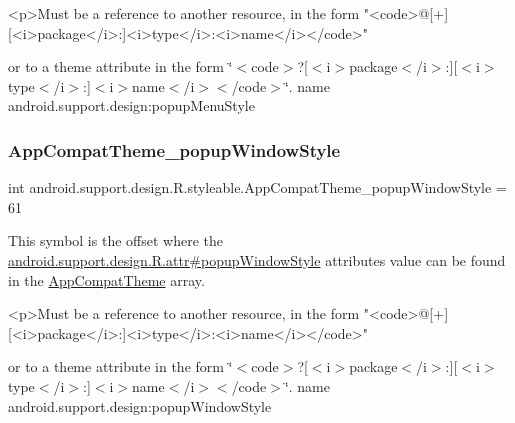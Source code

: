 \begin{DoxyVerb}      <p>Must be a reference to another resource, in the form "<code>@[+][<i>package</i>:]<i>type</i>:<i>name</i></code>"
\end{DoxyVerb}
 or to a theme attribute in the form \char`\"{}$<$code$>$?\mbox{[}$<$i$>$package$<$/i$>$\+:\mbox{]}\mbox{[}$<$i$>$type$<$/i$>$\+:\mbox{]}$<$i$>$name$<$/i$>$$<$/code$>$\char`\"{}.  name android.\+support.\+design\+:popup\+Menu\+Style \mbox{\label{classandroid_1_1support_1_1design_1_1R_1_1styleable_a2f386a19b0732d76a79e7a070ee99feb}} 
\subsubsection{\texorpdfstring{App\+Compat\+Theme\+\_\+popup\+Window\+Style}{AppCompatTheme\_popupWindowStyle}}
{\footnotesize\ttfamily int android.\+support.\+design.\+R.\+styleable.\+App\+Compat\+Theme\+\_\+popup\+Window\+Style = 61\hspace{0.3cm}{\ttfamily [static]}}

This symbol is the offset where the \hyperlink{classandroid_1_1support_1_1design_1_1R_1_1attr_a4adafbb4bec0c032be0f4c8652e5ac2b}{android.\+support.\+design.\+R.\+attr\#popup\+Window\+Style} attribute\textquotesingle{}s value can be found in the \hyperlink{classandroid_1_1support_1_1design_1_1R_1_1styleable_afb351dc8de20cbd4c89abe360373010c}{App\+Compat\+Theme} array.

\begin{DoxyVerb}      <p>Must be a reference to another resource, in the form "<code>@[+][<i>package</i>:]<i>type</i>:<i>name</i></code>"
\end{DoxyVerb}
 or to a theme attribute in the form \char`\"{}$<$code$>$?\mbox{[}$<$i$>$package$<$/i$>$\+:\mbox{]}\mbox{[}$<$i$>$type$<$/i$>$\+:\mbox{]}$<$i$>$name$<$/i$>$$<$/code$>$\char`\"{}.  name android.\+support.\+design\+:popup\+Window\+Style \mbox{\label{classandroid_1_1support_1_1design_1_1R_1_1styleable_abf40525373a47503a3a32d0d28968936}} 
